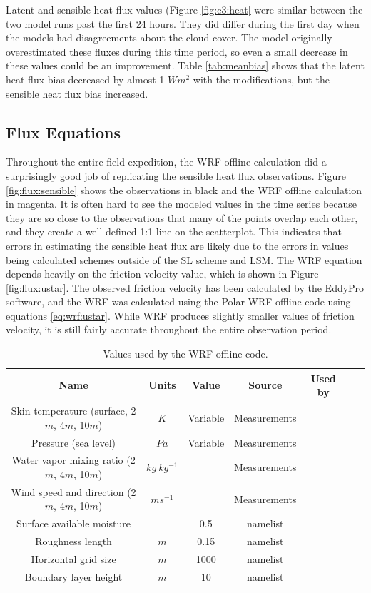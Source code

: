 {Latent and sensible heat flux values (Figure \ref{fig:c3:heat} were similar between the two model runs past the first 24 hours. They did differ during the first day when the models had disagreements about the cloud cover. The model originally overestimated these fluxes during this time period, so even a small decrease in these values could be an improvement. Table \ref{tab:meanbias} shows that the latent heat flux bias decreased by almost 1 $Wm^{2}$ with the modifications, but the sensible heat flux bias increased. 

\subsection{Flux Equations}

Throughout the entire field expedition, the WRF offline calculation did a surprisingly good job of replicating the sensible heat flux observations. Figure \ref{fig:flux:sensible} shows the observations in black and the WRF offline calculation in magenta. It is often hard to see the modeled values in the time series because they are so close to the observations that many of the points overlap each other, and they create a well-defined 1:1 line on the scatterplot. This indicates that errors in estimating the sensible heat flux are likely due to the errors in values being calculated schemes outside of the SL scheme and LSM. The WRF equation depends heavily on the friction velocity value, which is shown in Figure \ref{fig:flux:ustar}. The observed friction velocity has been calculated by the EddyPro software, and the WRF was calculated using the Polar WRF offline code using equations \ref{eq:wrf:ustar}. While WRF produces slightly smaller values of friction velocity, it is still fairly accurate throughout the entire observation period. 

\begin{table}[h]
\centering
\footnotesize
\doublespacing
{
\begin{tabular}{| c | c | c | c | c | c | c |}
\hline
\rowcolor[HTML]{F3F3F3} \textbf{Name} & \textbf{Units} & \textbf{Value} & \textbf{Source} & \textbf{Used by} \\ 
\hline
Skin temperature (surface, 2$m$, 4$m$, 10$m$) & $K$ & Variable & Measurements & \\
Pressure (sea level) & $Pa$ & Variable & Measurements & \\
Water vapor mixing ratio (2$m$, 4$m$, 10$m$) & $kg~kg^{-1}$ & & Measurements & \\
Wind speed and direction (2$m$, 4$m$, 10$m$) & $ms^{-1}$ & & Measurements & \\
Surface available moisture & & 0.5 & namelist & \\
Roughness length & $m$ & 0.15 & namelist & \\
Horizontal grid size & $m$ & 1000 & namelist & \\
Boundary layer height & $m$ & 10 & namelist & \\
\hline
\end{tabular}}
\caption{Values used by the WRF offline code.}
\label{tab:wrf:wrfsettings_offline}
\end{table}

}
